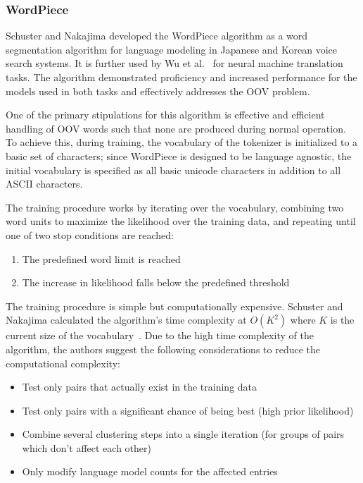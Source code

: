 \documentclass[12pt]{article}
\begin{document}
\subsubsection{WordPiece}\label{sec:wordpiece}
Schuster and Nakajima \cite{schuster_japanese_2012} developed the WordPiece algorithm as a word segmentation algorithm for language modeling in
Japanese and Korean voice search systems. It is further used by Wu et al.~\cite{wu_googles_2016} for neural machine translation tasks. The algorithm
demonstrated proficiency and increased performance for the models used in both tasks and effectively addresses the OOV problem.

One of the primary stipulations for this algorithm is effective and efficient handling of OOV words such that none are produced during normal
operation. To achieve this, during training, the vocabulary of the tokenizer is initialized to a basic set of characters; since WordPiece is designed
to be language agnostic, the initial vocabulary is specified as all basic unicode characters in addition to all ASCII characters.

The training procedure works by iterating over the vocabulary, combining two word units to maximize the likelihood over the training data, and
repeating until one of two stop conditions are reached:

\begin{enumerate}
    \item The predefined word limit is reached
    \item The increase in likelihood falls below the predefined threshold
\end{enumerate}

The training procedure is simple but computationally expensive. Schuster and Nakajima calculated the algorithm's time complexity at $O(K^2)$ where $K$
is the current size of the vocabulary~\cite{schuster_japanese_2012}. Due to the high time complexity of the algorithm, the authors suggest the
following considerations to reduce the computational complexity:

\begin{itemize}
    \item Test only pairs that actually exist in the training data
    \item Test only pairs with a significant chance of being best (high prior likelihood)
    \item Combine several clustering steps into a single iteration (for groups of pairs which don't affect each other)
    \item Only modify language model counts for the affected entries
\end{itemize}
\end{document}
